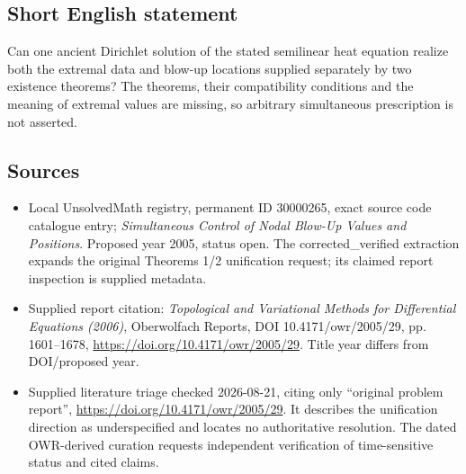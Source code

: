 \documentclass[11pt]{article}
\begin{document}
\subsection{Short English statement}
Can one ancient Dirichlet solution of the stated semilinear heat equation realize both the extremal data and blow-up locations supplied separately by two existence theorems? The theorems, their compatibility conditions and the meaning of extremal values are missing, so arbitrary simultaneous prescription is not asserted.
\subsection{Sources}
\begin{itemize}
\item Local UnsolvedMath registry, permanent ID 30000265, exact source code catalogue entry; \emph{Simultaneous Control of Nodal Blow-Up Values and Positions}. Proposed year 2005, status open. The corrected\_verified extraction expands the original Theorems 1/2 unification request; its claimed report inspection is supplied metadata.
\item Supplied report citation: \emph{Topological and Variational Methods for Differential Equations (2006)}, Oberwolfach Reports, DOI 10.4171/owr/2005/29, pp. 1601--1678, \url{https://doi.org/10.4171/owr/2005/29}. Title year differs from DOI/proposed year.
\item Supplied literature triage checked 2026-08-21, citing only ``original problem report'', \url{https://doi.org/10.4171/owr/2005/29}. It describes the unification direction as underspecified and locates no authoritative resolution. The dated OWR-derived curation requests independent verification of time-sensitive status and cited claims.
\end{itemize}
\end{document}
